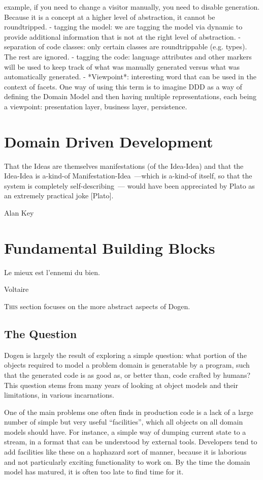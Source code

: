 \documentclass{book}
\begin{document}
    example, if you need to change a visitor manually, you need to
    disable generation. Because it is a concept at a higher level of
    abstraction, it cannot be roundtripped.
  - tagging the model: we are tagging the model via dynamic to provide
    additional information that is not at the right level of
    abstraction.
  - separation of code classes: only certain classes are
    roundtrippable (e.g. types). The rest are ignored.
  - tagging the code: language attributes and other markers will be
    used to keep track of what was manually generated versus what was
    automatically generated.
- *Viewpoint*: interesting word that can be used in the context of
  facets. One way of using this term is to imagine DDD as a way of
  defining the Domain Model and then having multiple representations,
  each being a viewpoint: presentation layer, business layer,
  persistence.

\chapter{Domain Driven Development}
\label{ddd}

\epigraph{That the Ideas are themselves manifestations (of the
  Idea-Idea) and that the Idea-Idea is a-kind-of
  Manifestation-Idea~---which is a-kind-of itself, so that the system
  is completely self-describing~--- would have been appreciated by
  Plato as an extremely practical joke [Plato].}{Alan Key}

\chapter{Fundamental Building Blocks}

\epigraph{Le mieux est l'ennemi du bien.}{Voltaire}

\lettrine{T}{his} section focuses on the more abstract aspects of
Dogen.

\section{The Question}

Dogen is largely the result of exploring a simple question: what
portion of the objects required to model a problem domain is
generatable by a program, such that the generated code is as good as,
or better than, code crafted by humans? This question stems from many
years of looking at object models and their limitations, in various
incarnations.

One of the main problems one often finds in production code is a lack
of a large number of simple but very useful ``facilities'', which all
objects on all domain models should have. For instance, a simple way
of dumping current state to a stream, in a format that can be
understood by external tools. Developers tend to add facilities like
these on a haphazard sort of manner, because it is laborious and not
particularly exciting functionality to work on. By the time the domain
model has matured, it is often too late to find time for it.
\end{document}
